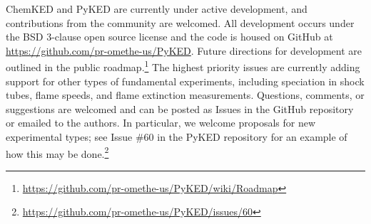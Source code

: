 \documentclass[12pt]{ijck}
\newcommand\ck{ChemKED}
\newcommand\pk{PyKED}
\begin{document}
\ck{} and \pk{} are currently under active development, and contributions from
the community are welcomed. All development occurs under the BSD 3-clause open source
license and the code is housed on GitHub at
\url{https://github.com/pr-omethe-us/PyKED}. Future directions for development
are outlined in the public
roadmap.\footnote{\url{https://github.com/pr-omethe-us/PyKED/wiki/Roadmap}}
The highest priority issues are currently adding support for other types of
fundamental experiments, including speciation in shock tubes, flame speeds,
and flame extinction measurements.
Questions, comments, or suggestions are welcomed and can be posted as Issues in the
GitHub repository or emailed to the authors. In particular, we welcome proposals for new
experimental types; see Issue \#60 in the \pk{} repository for an example of how this may
be done.\footnote{\url{https://github.com/pr-omethe-us/PyKED/issues/60}}

\printbibliography
\end{document}
